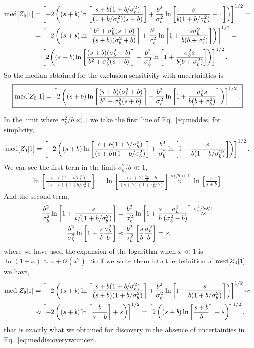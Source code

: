 \documentclass[12pt,a4paper]{article}
\newcommand{\approxtext}[1]{\ensuremath{\stackrel{#1}{\approx}}}
\begin{document}
\begin{align}
{\rm med}[Z_0|1]=&\left[-2\left((s+b)\ln\left[\frac{s+b(1+b/\sigma_b^2)}{(1+b/\sigma_b^2)(s+b)}\right]+\frac{b^2}{\sigma_b^2}\ln\left[\frac{s}{b(1+b/\sigma_b^2)}+1\right]\right)\right]^{1/2}=\notag\\
=&\left[-2\left((s+b)\ln\left[\frac{b^2+\sigma_b^2(s+b)}{(s+b)(\sigma_b^2+b)}\right]+\frac{b^2}{\sigma_b^2}\ln\left[1+\frac{s\sigma_b^2}{b(b+\sigma_b^2)}\right]\right)\right]^{1/2}=\notag\\
=&\left[
2\left((s+b)\ln\left[\frac{(s+b)(\sigma_b^2+b)}{b^2+\sigma_b^2(s+b)}\right]-\frac{b^2}{\sigma_b^2}\ln\left[1+\frac{\sigma_b^2s}{b(b+\sigma_b^2)}\right]\right)
\right]^{1/2}.
\label{eq:meddes}
\end{align}
So the median obtained for the exclusion sensitivity with uncertainties is
\begin{align}
\boxed{{\rm med}[Z_0|1]=\left[
2\left((s+b)\ln\left[\frac{(s+b)(\sigma_b^2+b)}{b^2+\sigma_b^2(s+b)}\right]-\frac{b^2}{\sigma_b^2}\ln\left[1+\frac{\sigma_b^2s}{b(b+\sigma_b^2)}\right]\right)
\right]^{1/2}.}
\end{align}

In the limit where $\sigma_b^2/b\ll 1$ we take the first line of Eq.~\eqref{eq:meddes} for simplicity,
\begin{align}
{\rm med}[Z_0|1]=\left[
-2\left((s+b)\ln\left[\frac{s+b(1+b/\sigma_b^2)}{(s+b)(1+b/\sigma_b^2)}\right]+\frac{b^2}{\sigma_b^2}\ln\left[1+\frac{s}{b(1+b/\sigma_b^2)}\right]\right)
\right]^{1/2}.
\end{align}
We can see the first term in the limit $\sigma_b^2/b\ll 1$,
\begin{align}
\ln\left[\frac{s+b(1+b/\sigma_b^2)}{(s+b)(1+b/\sigma_b^2)}\right]=\ln\left[\frac{(s+b)\frac{\sigma_b^2}{b} + b}{(s+b)(1+\sigma_b^2/b)}\right]\approxtext{\sigma_b^2/b\ll 1}\ln\left[\frac{b}{s+b}\right].
\end{align}
And the second term,
\begin{align}
\frac{b^2}{\sigma_b^2}\ln\left[1+\frac{s}{b/(1+b/\sigma_b^2)}\right]&=\frac{b^2}{\sigma_b^2}\ln\left[1+\frac{s}{b}\frac{\sigma_b^2}{(\sigma_b^2+b)}\right]\approxtext{\sigma_b^2/b\ll 1} \notag\\ \frac{b^2}{\sigma_b^2}\ln\left[1+\frac{s}{b}\frac{\sigma_b^2}{b}\right]
&\approx \frac{b^2}{\sigma_b^2}\left[\frac{s}{b}\frac{\sigma_b^2}{b}\right]=s,
\end{align}
where we have used the expansion of the logarithm when $x\ll 1$ is $\ln(1+x)\approx x+\mathcal{O}(x^2)$. So if we write them into the definition of ${\rm med}[Z_0|1]$ we have,
\begin{align}
{\rm med}[Z_0|1]=&\left[
-2\left((s+b)\ln\left[\frac{s+b(1+b/\sigma_b^2)}{(s+b)(1+b/\sigma_b^2)}\right]+\frac{b^2}{\sigma_b^2}\ln\left[1+\frac{s}{b(1+b/\sigma_b^2)}\right]\right)
\right]^{1/2}\approx \notag\\
\approx &\left[-2\left((s+b)\ln\left[\frac{b}{s+b}\right]+s\right)\right]^{1/2}=\left[2\left((s+b)\ln\left[\frac{s+b}{b}\right]-s\right)\right]^{1/2},
\end{align}
that is exactly what we obtained for discovery in the absence of uncertainties in Eq.~\eqref{eq:meddiscoverywouncer}.
\end{document}
